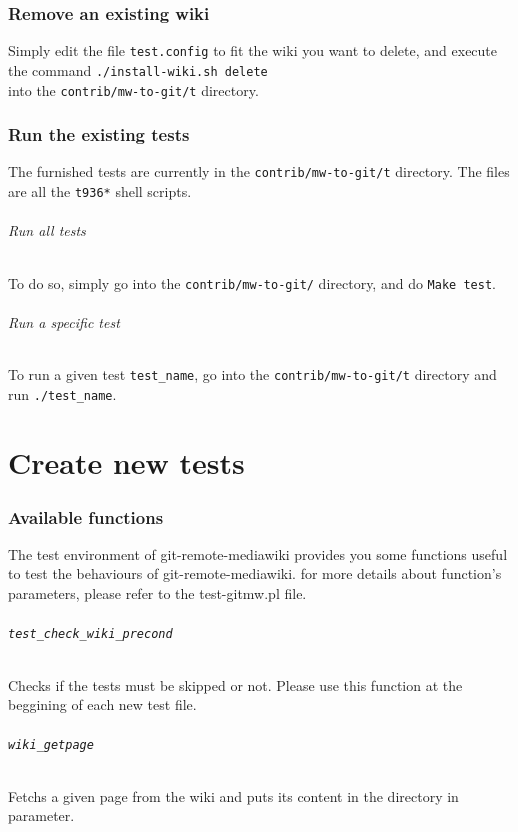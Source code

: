\documentclass[11pt]{article}
\begin{document}
\section{Remove an existing wiki}
Simply edit the file \lstinline!test.config! to fit the wiki you want to delete, and execute the command \lstinline!./install-wiki.sh delete!\\
into the \lstinline!contrib/mw-to-git/t! directory.
\section{Run the existing tests}
The furnished tests are currently in the \lstinline!contrib/mw-to-git/t! directory. The files are all the \lstinline!t936*! shell scripts.\\

\paragraph*{Run all tests}
To do so, simply go into the \lstinline!contrib/mw-to-git/! directory, and do \lstinline!Make test!.

\paragraph*{Run a specific test}
To run a given test \lstinline!test_name!, go into the \lstinline!contrib/mw-to-git/t! directory and run \lstinline!./test_name!.

\part*{Create new tests}

\section{Available functions}
The test environment of git-remote-mediawiki provides you some functions useful to test the behaviours of git-remote-mediawiki. for more details about function's parameters, please refer to the test-gitmw.pl file.

\paragraph*{\lstinline!test_check_wiki_precond!}
Checks if the tests must be skipped or not. Please use this function at the beggining of each new test file.

\paragraph*{\lstinline!wiki_getpage!}
Fetchs a given page from the wiki and puts its content in the directory in parameter.
\end{document}
